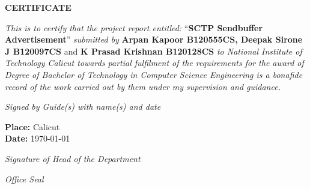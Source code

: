 \thispagestyle{empty}
\vspace*{1cm}
{\centering \textbf{CERTIFICATE}\\[1.5cm]}

\noindent
\textit{This is to certify that the project report entitled:}
``{\textbf{SCTP Sendbuffer Advertisement}}''
\textit{submitted by}
\textbf{Arpan Kapoor B120555CS, Deepak Sirone J B120097CS} and
\textbf{K Prasad Krishnan B120128CS}
\textit{
to National Institute of Technology Calicut towards partial fulfilment of the
requirements for the award of Degree of Bachelor of Technology in Computer
Science Engineering is a bonafide record of the work carried out by them under
my supervision and guidance.}
\vspace{2cm}

\begin{flushright}
  \textit{Signed by Guide(s) with name(s) and date}
\end{flushright}

\vspace{1cm}

\parbox[t]{8.5cm}{
\textbf{Place:} Calicut \\
\textbf{Date:} \today \\
}

\begin{flushright}
  \vspace*{2cm}
  \textit{Signature of Head of the Department}
\end{flushright}

\begin{center}
  \vspace*{1cm}
  \textit{Office Seal}
\end{center}
